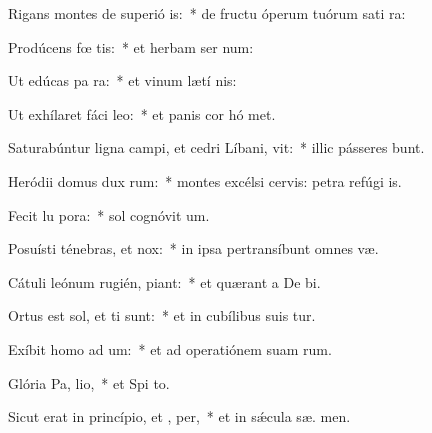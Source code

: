 \item Rigans montes de superió is:~* de fructu óperum tuórum sati ra:
\item Prodúcens fœ tis:~* et herbam ser num:
\item Ut edúcas pa  ra:~* et vinum lætí  nis:
\item Ut exhílaret fáci  leo:~* et panis cor hó met.
\item Saturabúntur ligna campi, et cedri Líbani,  vit:~* illic pásseres bunt.
\item Heródii domus dux  rum:~* montes excélsi cervis: petra refúgi is.
\item Fecit lu  pora:~* sol cognóvit  um.
\item Posuísti ténebras, et   nox:~* in ipsa pertransíbunt omnes  væ.
\item Cátuli leónum rugién,  piant:~* et quærant a De  bi.
\item Ortus est sol, et ti sunt:~* et in cubílibus suis tur.
\item Exíbit homo ad  um:~* et ad operatiónem suam   rum.
\item Glória Pa,  lio,~* et Spi to.
\item Sicut erat in princípio, et ,  per,~* et in sǽcula sæ. men.
